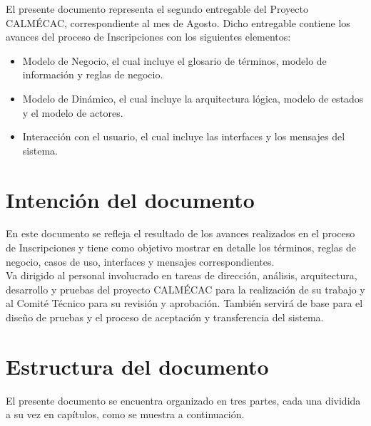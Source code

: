 	
	El presente documento representa el segundo entregable del Proyecto CALMÉCAC, correspondiente al mes de Agosto. Dicho entregable contiene los avances del proceso de Inscripciones con los siguientes elementos:

	\begin{itemize}
		\item Modelo de Negocio, el cual incluye el glosario de términos, modelo de información y reglas de negocio.
		\item Modelo de Dinámico, el cual incluye la arquitectura lógica, modelo de estados y el modelo de actores.
		\item Interacción con el usuario, el cual incluye las interfaces y los mensajes del sistema.
	\end{itemize}

\section{Intención del documento}

	En este documento se refleja el resultado de los avances realizados en el proceso de Inscripciones y tiene como objetivo mostrar en detalle los términos, reglas de negocio, casos de uso, interfaces y mensajes correspondientes.\\

	Va dirigido al personal involucrado en tareas de dirección, análisis, arquitectura, desarrollo y pruebas del proyecto CALMÉCAC para la realización de su trabajo y al Comité Técnico para su revisión y aprobación. También servirá de base para el diseño de pruebas y el proceso de aceptación y transferencia del sistema.

\section{Estructura del documento}

	El presente documento se encuentra organizado en tres partes, cada una dividida a su vez en capítulos, como se muestra a continuación.

